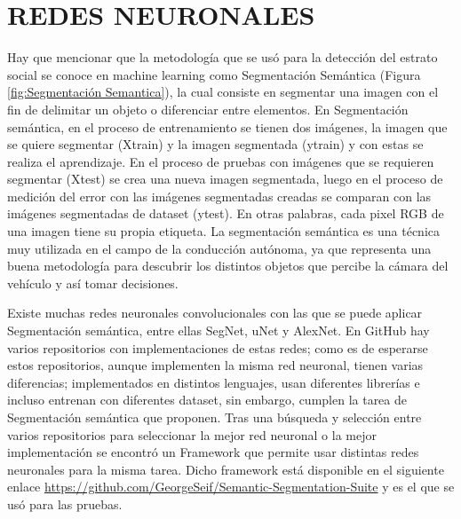 \section{REDES NEURONALES}
Hay que mencionar que la metodología que se usó para la detección del estrato social se conoce en machine learning como Segmentación Semántica (Figura \ref{fig:Segmentación Semantica}), la cual consiste en segmentar una imagen con el fin de delimitar un objeto o diferenciar entre elementos. En Segmentación semántica, en el proceso de entrenamiento se tienen dos imágenes, la imagen que se quiere segmentar (Xtrain) y la imagen segmentada (ytrain) y con estas se realiza el aprendizaje. En el proceso de pruebas con imágenes que se requieren segmentar (Xtest) se crea una nueva imagen segmentada, luego en el proceso de medición del error con las imágenes segmentadas creadas se comparan con las imágenes segmentadas de dataset (ytest). En otras palabras, cada pixel RGB de una imagen tiene su propia etiqueta. La segmentación semántica es una técnica muy utilizada en el campo de la conducción autónoma, ya que representa una buena metodología para descubrir los distintos objetos que percibe la cámara del vehículo y así tomar decisiones.
  
  
Existe muchas redes neuronales convolucionales con las que se puede aplicar Segmentación semántica, entre ellas SegNet, uNet y AlexNet. En GitHub hay varios repositorios con implementaciones de estas redes; como es de esperarse estos repositorios, aunque implementen la misma red neuronal, tienen varias diferencias; implementados en distintos lenguajes, usan diferentes librerías e incluso entrenan con diferentes dataset, sin embargo, cumplen la tarea de Segmentación semántica que proponen. Tras una búsqueda y selección entre varios repositorios para seleccionar la mejor red neuronal o la mejor implementación se encontró un Framework que permite usar distintas redes neuronales para la misma tarea. Dicho framework está disponible en el siguiente enlace \url{https://github.com/GeorgeSeif/Semantic-Segmentation-Suite} y es el que se usó para las pruebas.
 

